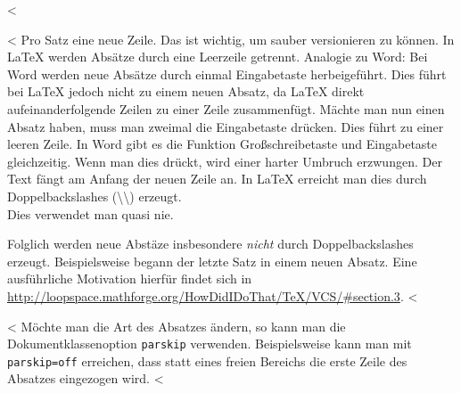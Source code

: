 <%

<%
Pro Satz eine neue Zeile.
Das ist wichtig, um sauber versionieren zu können.
In LaTeX werden Absätze durch eine Leerzeile getrennt.
Analogie zu Word: Bei Word werden neue Absätze durch einmal Eingabetaste herbeigeführt.
Dies führt bei LaTeX jedoch nicht zu einem neuen Absatz, da LaTeX direkt aufeinanderfolgende Zeilen zu einer Zeile zusammenfügt.
Mächte man nun einen Absatz haben, muss man zweimal die Eingabetaste drücken.
Dies führt zu einer leeren Zeile.
In Word gibt es die Funktion Großschreibetaste und Eingabetaste gleichzeitig.
Wenn man dies drückt, wird einer harter Umbruch erzwungen.
Der Text fängt am Anfang der neuen Zeile an.
In LaTeX erreicht man dies durch Doppelbackslashes (\textbackslash\textbackslash) erzeugt.
\\
Dies verwendet man quasi nie.

Folglich werden neue Abstäze insbesondere \emph{nicht} durch Doppelbackslashes erzeugt.
Beispielsweise begann der letzte Satz in einem neuen Absatz.
Eine ausführliche Motivation hierfür findet sich in \url{http://loopspace.mathforge.org/HowDidIDoThat/TeX/VCS/#section.3}.
<%

<%
Möchte man die Art des Absatzes ändern, so kann man die Dokumentklassenoption \texttt{parskip} verwenden.
Beispielsweise kann man mit \texttt{parskip=off} erreichen, dass statt eines freien Bereichs die erste Zeile des Absatzes eingezogen wird.
<%

